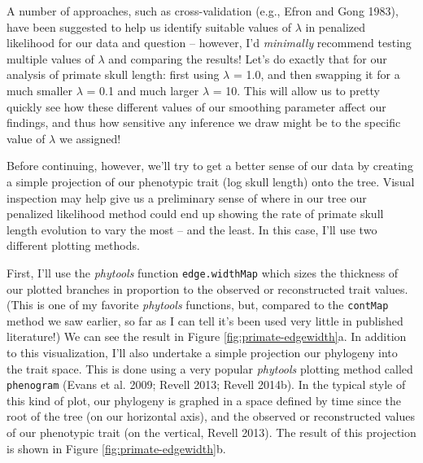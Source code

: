 \documentclass[fleqn,10pt,lineno]{wlpeerj} %
\begin{document}
A number of approaches, such as cross-validation (e.g., Efron and Gong 1983), have been suggested to help us identify suitable values of \(\lambda\) in penalized likelihood for our data and question -- however, I'd \emph{minimally} recommend testing multiple values of \(\lambda\) and comparing the results! Let's do exactly that for our analysis of primate skull length: first using \(\lambda\) = 1.0, and then swapping it for a much smaller \(\lambda\) = 0.1 and much larger \(\lambda\) = 10. This will allow us to pretty quickly see how these different values of our smoothing parameter affect our findings, and thus how sensitive any inference we draw might be to the specific value of \(\lambda\) we assigned!

Before continuing, however, we'll try to get a better sense of our data by creating a simple projection of our phenotypic trait (log skull length) onto the tree. Visual inspection may help give us a preliminary sense of where in our tree our penalized likelihood method could end up showing the rate of primate skull length evolution to vary the most -- and the least. In this case, I'll use two different plotting methods.

First, I'll use the \emph{phytools} function \texttt{edge.widthMap} which sizes the thickness of our plotted branches in proportion to the observed or reconstructed trait values. (This is one of my favorite \emph{phytools} functions, but, compared to the \texttt{contMap} method we saw earlier, so far as I can tell it's been used very little in published literature!) We can see the result in Figure \ref{fig:primate-edgewidth}a. In addition to this visualization, I'll also undertake a simple projection our phylogeny into the trait space. This is done using a very popular \emph{phytools} plotting method called \texttt{phenogram} (Evans et al. 2009; Revell 2013; Revell 2014b). In the typical style of this kind of plot, our phylogeny is graphed in a space defined by time since the root of the tree (on our horizontal axis), and the observed or reconstructed values of our phenotypic trait (on the vertical, Revell 2013). The result of this projection is shown in Figure \ref{fig:primate-edgewidth}b.
\end{document}
